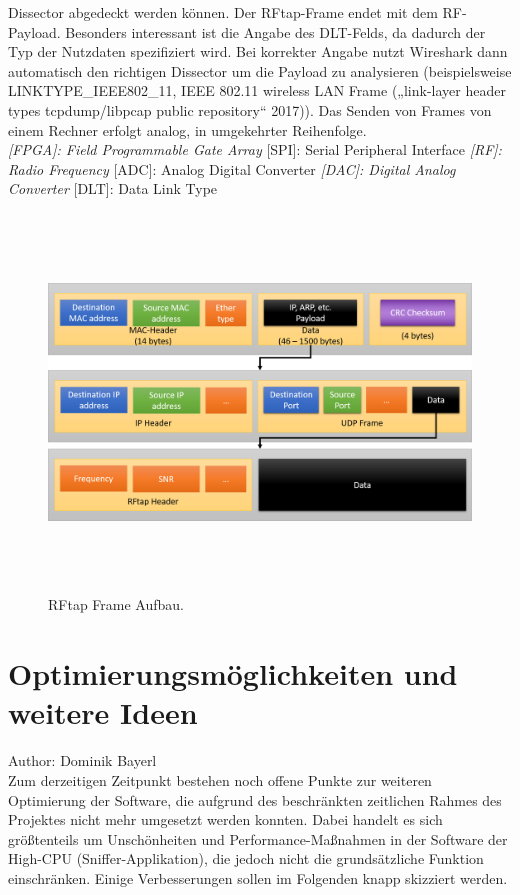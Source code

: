 \documentclass[letterpaper,11pt]{article}
\begin{document}
\begin{onehalfspace}
Dissector abgedeckt werden können. Der RFtap-Frame endet mit dem
RF-Payload. Besonders interessant ist die Angabe des DLT-Felds, da
dadurch der Typ der Nutzdaten spezifiziert wird. Bei korrekter Angabe
nutzt Wireshark dann automatisch den richtigen Dissector um die Payload
zu analysieren (beispielsweise LINKTYPE\_IEEE802\_11, IEEE 802.11
wireless LAN Frame („link-layer header types \textbar{} tcpdump/libpcap
public repository`` 2017)).
Das Senden von Frames von einem Rechner erfolgt analog, in umgekehrter
Reihenfolge.\\
\emph{{[}FPGA{]}: Field Programmable Gate Array }{[}SPI{]}: Serial
Peripheral Interface \emph{{[}RF{]}: Radio Frequency }{[}ADC{]}: Analog
Digital Converter \emph{{[}DAC{]}: Digital Analog Converter }{[}DLT{]}:
Data Link Type


\begin{figure}
\centering
\includegraphics [width = 16cm,height=10cm]{rftap.png}
\caption{RFtap Frame Aufbau.\label{fig:rftap}}
\end{figure}

\section{Optimierungsmöglichkeiten und weitere
Ideen}\label{optimierungsmuxf6glichkeiten-und-weitere-ideen}
\small Author: Dominik Bayerl\\
\Large
Zum derzeitigen Zeitpunkt bestehen noch offene Punkte zur weiteren
Optimierung der Software, die aufgrund des beschränkten zeitlichen
Rahmes des Projektes nicht mehr umgesetzt werden konnten.
Dabei handelt es sich größtenteils um Unschönheiten und
Performance-Maßnahmen in der Software der High-CPU
(Sniffer-Applikation), die jedoch nicht die grundsätzliche Funktion
einschränken. Einige Verbesserungen sollen im Folgenden knapp skizziert
werden.


\end{onehalfspace}
\end{document}
